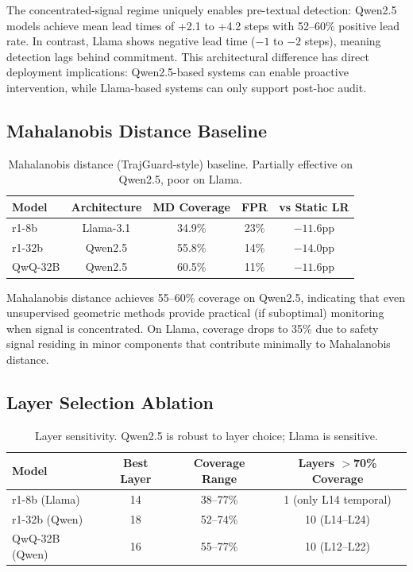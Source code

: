 \documentclass[11pt]{article}
\begin{document}
The concentrated-signal regime uniquely enables pre-textual detection: Qwen2.5 models achieve mean lead times of +2.1 to +4.2 steps with 52--60\% positive lead rate. In contrast, Llama shows negative lead time ($-1$ to $-2$ steps), meaning detection lags behind commitment. This architectural difference has direct deployment implications: Qwen2.5-based systems can enable proactive intervention, while Llama-based systems can only support post-hoc audit.

\subsection{Mahalanobis Distance Baseline}

\begin{table}[h]
\centering
\caption{Mahalanobis distance (TrajGuard-style) baseline. Partially effective on Qwen2.5, poor on Llama.}
\label{tab:mahalanobis}
\begin{tabular}{lcccc}
\toprule
Model & Architecture & MD Coverage & FPR & vs Static LR \\
\midrule
r1-8b & Llama-3.1 & 34.9\% & 23\% & $-11.6$pp \\
r1-32b & Qwen2.5 & 55.8\% & 14\% & $-14.0$pp \\
QwQ-32B & Qwen2.5 & 60.5\% & 11\% & $-11.6$pp \\
\bottomrule
\end{tabular}
\end{table}

Mahalanobis distance achieves 55--60\% coverage on Qwen2.5, indicating that even unsupervised geometric methods provide practical (if suboptimal) monitoring when signal is concentrated. On Llama, coverage drops to 35\% due to safety signal residing in minor components that contribute minimally to Mahalanobis distance.

\subsection{Layer Selection Ablation}

\begin{table}[h]
\centering
\caption{Layer sensitivity. Qwen2.5 is robust to layer choice; Llama is sensitive.}
\label{tab:layers}
\begin{tabular}{lccc}
\toprule
Model & Best Layer & Coverage Range & Layers $>$70\% Coverage \\
\midrule
r1-8b (Llama) & 14 & 38--77\% & 1 (only L14 temporal) \\
r1-32b (Qwen) & 18 & 52--74\% & 10 (L14--L24) \\
QwQ-32B (Qwen) & 16 & 55--77\% & 10 (L12--L22) \\
\bottomrule
\end{tabular}
\end{table}
\end{document}

